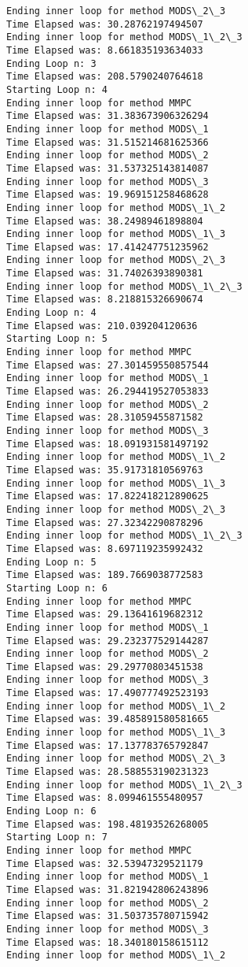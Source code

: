 \documentclass[11pt]{article}
\begin{document}
\begin{Verbatim}[commandchars=\\\{\}]
Ending inner loop for method MODS\_2\_3 
Time Elapsed was: 30.28762197494507
Ending inner loop for method MODS\_1\_2\_3 
Time Elapsed was: 8.661835193634033
Ending Loop n: 3 
Time Elapsed was: 208.5790240764618
Starting Loop n: 4
Ending inner loop for method MMPC 
Time Elapsed was: 31.383673906326294
Ending inner loop for method MODS\_1 
Time Elapsed was: 31.515214681625366
Ending inner loop for method MODS\_2 
Time Elapsed was: 31.537325143814087
Ending inner loop for method MODS\_3 
Time Elapsed was: 19.969151258468628
Ending inner loop for method MODS\_1\_2 
Time Elapsed was: 38.24989461898804
Ending inner loop for method MODS\_1\_3 
Time Elapsed was: 17.414247751235962
Ending inner loop for method MODS\_2\_3 
Time Elapsed was: 31.74026393890381
Ending inner loop for method MODS\_1\_2\_3 
Time Elapsed was: 8.218815326690674
Ending Loop n: 4 
Time Elapsed was: 210.039204120636
Starting Loop n: 5
Ending inner loop for method MMPC 
Time Elapsed was: 27.301459550857544
Ending inner loop for method MODS\_1 
Time Elapsed was: 26.294419527053833
Ending inner loop for method MODS\_2 
Time Elapsed was: 28.31059455871582
Ending inner loop for method MODS\_3 
Time Elapsed was: 18.091931581497192
Ending inner loop for method MODS\_1\_2 
Time Elapsed was: 35.91731810569763
Ending inner loop for method MODS\_1\_3 
Time Elapsed was: 17.822418212890625
Ending inner loop for method MODS\_2\_3 
Time Elapsed was: 27.32342290878296
Ending inner loop for method MODS\_1\_2\_3 
Time Elapsed was: 8.697119235992432
Ending Loop n: 5 
Time Elapsed was: 189.7669038772583
Starting Loop n: 6
Ending inner loop for method MMPC 
Time Elapsed was: 29.13641619682312
Ending inner loop for method MODS\_1 
Time Elapsed was: 29.232377529144287
Ending inner loop for method MODS\_2 
Time Elapsed was: 29.29770803451538
Ending inner loop for method MODS\_3 
Time Elapsed was: 17.490777492523193
Ending inner loop for method MODS\_1\_2 
Time Elapsed was: 39.485891580581665
Ending inner loop for method MODS\_1\_3 
Time Elapsed was: 17.137783765792847
Ending inner loop for method MODS\_2\_3 
Time Elapsed was: 28.588553190231323
Ending inner loop for method MODS\_1\_2\_3 
Time Elapsed was: 8.099461555480957
Ending Loop n: 6 
Time Elapsed was: 198.48193526268005
Starting Loop n: 7
Ending inner loop for method MMPC 
Time Elapsed was: 32.53947329521179
Ending inner loop for method MODS\_1 
Time Elapsed was: 31.821942806243896
Ending inner loop for method MODS\_2 
Time Elapsed was: 31.503735780715942
Ending inner loop for method MODS\_3 
Time Elapsed was: 18.340180158615112
Ending inner loop for method MODS\_1\_2 

\end{Verbatim}
\end{document}
